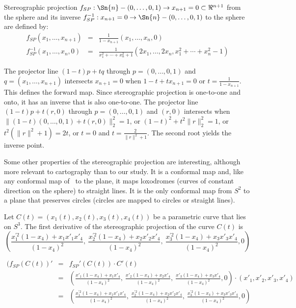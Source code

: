 \documentclass[12pt]{article}
\begin{document}
\begin{lemma}
Stereographic projection 
$f_{SP}: \Sn{n} - (0,\ldots,0,1) \rightarrow x_{n+1}=0 \subset \Re^{n+1}$ 
from the sphere
and its inverse $f_{SP}^{-1}: x_{n+1}=0 \rightarrow \Sn{n} - (0,\ldots,0,1)$ 
to the sphere
are defined by:
\begin{eqnarray*}
f_{SP}(x_1,\ldots,x_{n+1}) & = & \frac{1}{1-x_{n+1}} (x_1,\ldots,x_n,0) \\
f_{SP}^{-1}(x_1,\ldots,x_n,0) & = &
	\frac{1}{x_1^2 + \cdots + x_n^2 + 1} 
	(2x_1, \ldots, 2x_n, x_1^2 + \cdots + x_n^2 - 1)
\end{eqnarray*}	%
\end{lemma}
\vspace{.1in}
\prf
The projector line $(1-t)p + tq$ through $p = (0,\ldots,0,1)$ and 
$q = (x_1,\ldots,x_{n+1})$ intersects $x_{n+1}=0$ 
when $1-t + tx_{n+1} = 0$ or $t = \frac{1}{1-x_{n+1}}$.
This defines the forward map.
Since stereographic projection is one-to-one and onto,
it has an inverse that is also one-to-one.
The projector line $(1-t)p + t(r,0)$ through $p = (0,\ldots,0,1)$ and $(r,0)$
intersects  when $\|(1-t)(0,\ldots,0,1) + t(r,0)\|_2^2 = 1$,
or $(1-t)^2 + t^2\|r\|_2^2 = 1$, or $t^2(\|r\|^2 + 1) = 2t$, or 
$t=0$ and $t=\frac{2}{\|r\|^2 + 1}$.
The second root yields the inverse point.
\QED

Some other properties of the stereographic projection are interesting, although
more relevant to cartography than to our study.
It is a conformal map and, like any conformal map of \ to the plane,
it maps loxodromes (curves of constant direction on the sphere) to straight lines.
It is the only conformal map from $S^2$ to a plane that preserves
circles (circles are mapped to circles or straight lines).

\clearpage

\begin{lemma}
Let $C(t) = (x_1(t),x_2(t),x_3(t),x_4(t))$ be a parametric curve that lies on $S^3$.
The first derivative of the stereographic projection of the curve $C(t)$ is 
\[
(\frac{x^{'2}_1(1-x_4) + x_1x'_1x'_4}{(1-x_4)^2},\ 
                \frac{x^{'2}_2(1-x_4) + x_2x'_2x'_4}{(1-x_4)^2},\  
                  \frac{x^{'2}_3(1-x_4) + x_3x'_3x'_4}{(1-x_4)^2}, 0)
\]
\end{lemma}
\prf
\begin{eqnarray*}
(f_{SP}(C(t))' & = & f_{SP}'(C(t)) \cdot C'(t) \\
           & = & (\frac{x'_1(1-x_4) + x_1x'_4}{(1-x_4)^2},\ 
                  \frac{x'_2(1-x_4) + x_2x'_4}{(1-x_4)^2},\  
                  \frac{x'_3(1-x_4) + x_3x'_4}{(1-x_4)^2}, 0) 
		  \cdot (x'_1, x'_2, x'_3, x'_4) \\
           & = & (\frac{x^{'2}_1(1-x_4) + x_1x'_1x'_4}{(1-x_4)^2},\ 
                  \frac{x^{'2}_2(1-x_4) + x_2x'_2x'_4}{(1-x_4)^2},\  
                  \frac{x^{'2}_3(1-x_4) + x_3x'_3x'_4}{(1-x_4)^2}, 0)
\end{eqnarray*}
\QED
\end{document}
